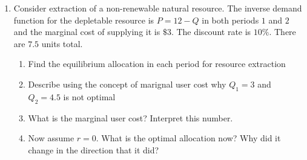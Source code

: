 \documentclass[11pt]{article}
\newcommand{\answer}[1]{\iftoggle{INCLUDEANSWERS}{{\color{violet!70!white}\textbf{Solution:} #1}}{}}
\begin{document}
\begin{enumerate}
  \item Consider extraction of a non-renewable natural resource. The inverse demand function for the depletable resource is $P = 12 - Q$ in both periods $1$ and $2$ and the marginal cost of supplying it is $\$3$. The discount rate is $10\%$. There are $7.5$ units total.

  \begin{enumerate}
    \item Find the equilibrium allocation in each period for resource extraction

    \item Describe using the concept of marignal user cost why $Q_1 = 3$ and $Q_2 = 4.5$ is not optimal

    \item What is the marginal user cost? Interpret this number.

    \item Now assume $r = 0$. What is the optimal allocation now? Why did it change in the direction that it did?
  \end{enumerate}

  \answer{
    \begin{enumerate}
      \item Our resource constraint can be written as $Q_2 = 7.5 - Q_1$. The $MNB_1 = 12 - Q_1 - 3 = 9 - Q_1$ and $PVMNB_2 = \frac{12 - Q_2 - 3}{1.1} = \frac{9 - Q_2}{1.1}$. 
      
      Plugging our resource constraint into the optimality condition $MNB_1 = PVMNB_2$ yields
      $$
        9 - Q_1 = \frac{9 - (7.5 - Q_1)}{1.1} \implies Q_1^* = 4
      $$

      Plugging $Q_1^*$ back into the resouce constraint yields $Q_2^* = 7.5 - 4 = 3.5$. 
  
      \item $MNB_1(3) = 9 - 3 = 6$ and $PVMNB_2(4.5) = \frac{9 - 4.5}{1.1} = 4.1$. In this case, the value of extracting one more resource in period 1 is greater than the value lost from extracting one fewer unit in period 2. Therefore, total net benefits are not maximized since resource extraction should be moved towards period 1. 
  
      \item In $MUC = MNB_1(Q_1^*) = 9 - 4 = 5$. The marginal user cost implies that adding one additional unit to our resources is worth about \$5 in net benefits. 
  
      \item Following the above work, we have
      $$
        9 - Q_1 = \frac{9 - (7.5 - Q_1)}{1} \implies Q_1^* = 3.75
      $$


\end{enumerate}}
\end{enumerate}
\end{document}
